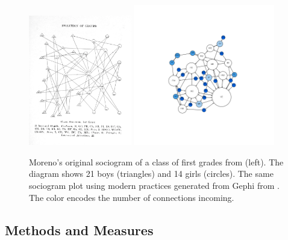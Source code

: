 \begin{figure}
    \centering %
    \includegraphics[width=0.4\textwidth]{static/figures/RelatedWork/Moreno-1}
    \includegraphics[width=0.55\textwidth]{static/figures/RelatedWork/Moreno-1_GrandJean}
    \caption{Moreno's original sociogram of a class of first grades from \cite{morenoWhoShallSurvive1934} (left). The diagram shows 21 boys (triangles) and 14 girls (circles). The same sociogram plot using modern practices generated from Gephi from \cite{grandjeanSocialNetworkAnalysis2015}. The color encodes the number of connections incoming.}
    \label{fig:moreno-sociogram}
\end{figure}



\subsection{Methods and Measures}


